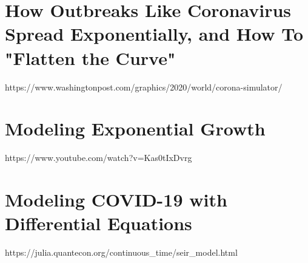 \documentclass{amsart}
\theoremstyle{definition}
\numberwithin{equation}{section}
\begin{document}
\begin{sansmath}
\section{How Outbreaks Like Coronavirus Spread Exponentially, and How To "Flatten the Curve"}
https://www.washingtonpost.com/graphics/2020/world/corona-simulator/\\
\lipsum[1-3]

\section{Modeling Exponential Growth}
https://www.youtube.com/watch?v=Kas0tIxDvrg\\
\lipsum[2-3]

\section{Modeling COVID-19 with Differential Equations}
https://julia.quantecon.org/continuous_time/seir_model.html \\
\lipsum[3-4]
\end{sansmath}
\end{document}
